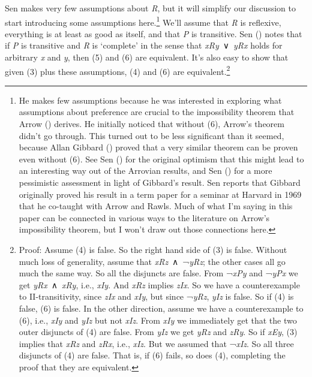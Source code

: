 \documentclass[
  11pt,
  letterpaper,
  DIV=11,
  numbers=noendperiod,
  twoside]{scrartcl}
\begin{document}
Sen makes very few assumptions about \emph{R}, but it will simplify our
discussion to start introducing some assumptions here.\footnote{He makes
  few assumptions because he was interested in exploring what
  assumptions about preference are crucial to the impossibility theorem
  that Arrow () derives. He initially
  noticed that without (6), Arrow's theorem didn't go through. This
  turned out to be less significant than it seemed, because Allan
  Gibbard () proved that a very similar
  theorem can be proven even without (6). See Sen
  () for the original optimism that this
  might lead to an interesting way out of the Arrovian results, and Sen
  () for a more pessimistic
  assessment in light of Gibbard's result. Sen reports that Gibbard
  originally proved his result in a term paper for a seminar at Harvard
  in 1969 that he co-taught with Arrow and Rawls. Much of what I'm
  saying in this paper can be connected in various ways to the
  literature on Arrow's impossibility theorem, but I won't draw out
  those connections here.} We'll assume that \emph{R} is reflexive,
everything is at least as good as itself, and that \emph{P} is
transitive. Sen () notes
that if \emph{P} is transitive and \emph{R} is `complete' in the sense
that \emph{xRy}~∨~\emph{yRx} holds for arbitrary \emph{x} and \emph{y},
then (5) and (6) are equivalent. It's also easy to show that given (3)
plus these assumptions, (4) and (6) are equivalent.\footnote{Proof:
  Assume (4) is false. So the right hand side of (3) is false. Without
  much loss of generality, assume that \emph{xRz}~∧~¬\emph{yRz}; the
  other cases all go much the same way. So all the disjuncts are false.
  From ¬\emph{xPy} and ¬\emph{yPx} we get \emph{yRx}~∧~\emph{xRy}, i.e.,
  \emph{xIy}. And \emph{xRz} implies \emph{zIx}. So we have a
  counterexample to II-transitivity, since \emph{zIx} and \emph{xIy},
  but since ¬\emph{yRz}, \emph{yIz} is false. So if (4) is false, (6) is
  false. In the other direction, assume we have a counterexample to (6),
  i.e., \emph{xIy} and \emph{yIz} but not \emph{xIz}. From \emph{xIy} we
  immediately get that the two outer disjuncts of (4) are false. From
  \emph{yIz} we get \emph{yRz} and \emph{zRy}. So if \emph{xEy}, (3)
  implies that \emph{xRz} and \emph{zRx}, i.e., \emph{xIz}. But we
  assumed that ¬\emph{xIz}. So all three disjuncts of (4) are false.
  That is, if (6) fails, so does (4), completing the proof that they are
  equivalent.}
\end{document}
